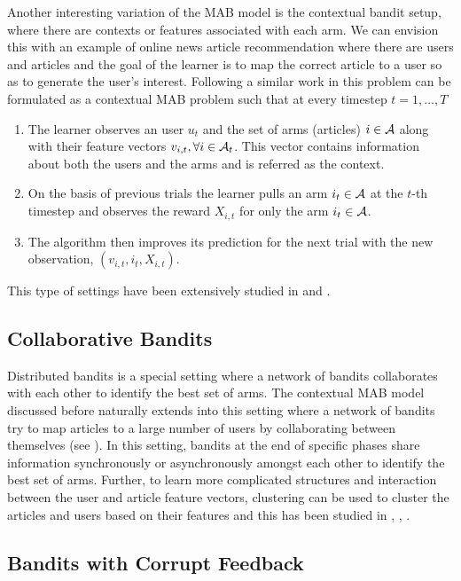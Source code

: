 Another interesting variation of the MAB model is the contextual bandit setup, where there are contexts or features associated with each arm. We can envision this with an example of online news article recommendation where there are users and articles and the goal of the learner is to map the correct article to a user so as to generate the user's  interest. Following a similar work in \citet{langford2008epoch} this problem can be formulated as a contextual MAB problem such that at every timestep $t=1,\ldots, T$
\begin{enumerate}
\item The learner observes an user $u_t$ and the set of arms (articles) $i\in\mathcal{A}$ along with their feature vectors ${v}_{i,t},\forall i\in\mathcal{A}_t$. This vector contains information about both the users and the arms and is referred as the context.
\item On the basis of previous trials the learner pulls an arm $i_t\in\mathcal{A}$ at the $t$-th timestep and observes the reward $X_{i,t}$ for only the arm $i_t\in\mathcal{A}$.
\item The algorithm then improves its prediction for the next trial with the new observation, $\left(v_{i,t},i_{t}, X_{i,t} \right)$.
\end{enumerate}
This type of settings have been extensively studied in \citet{li2010contextual} and \citet{beygelzimer2011contextual}.

\subsection{Collaborative Bandits}

Distributed bandits is a special setting where a network of bandits collaborates with each other to identify the best set of arms. The contextual MAB model discussed before naturally extends into this setting where a network of bandits try to map articles to a large number of users by collaborating between themselves (see \citet{awerbuch2008competitive,liu2010distributed,szorenyi2013gossip,hillel2013distributed}). In this setting, bandits at the end of specific phases share information synchronously or asynchronously amongst each other to identify the best set of arms. Further, to learn more complicated structures and interaction between the user and article feature vectors, clustering can be used to cluster the articles and users based on their features and this has been studied in \citet{bui2012clustered}, \citet{cesa2013gang}, \citet{gentile2014online}.

\subsection{Bandits with Corrupt Feedback}

